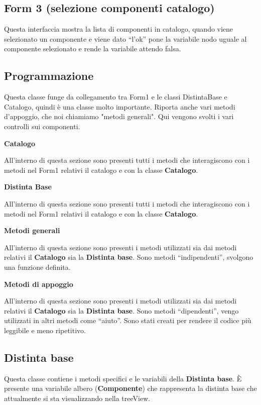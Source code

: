 \documentclass[12pt,twoside]{report}
\begin{document}
\subsection{Form 3 (selezione componenti catalogo)}

Questa interfaccia mostra la lista di componenti in catalogo, quando viene selezionato un componente e viene dato “l’ok” pone la variabile nodo uguale al componente selezionato e rende la variabile attendo falsa.

\subsection{Programmazione}

Questa classe funge da collegamento tra Form1 e le classi DistintaBase e Catalogo, quindi è una classe molto importante. Riporta anche vari metodi d'appoggio, che noi chiamiamo "metodi generali". Qui vengono svolti i vari controlli sui componenti.
 
\bigskip 
\textbf{Catalogo}

All’interno di questa sezione sono presenti tutti i metodi che interagiscono con i metodi nel Form1 relativi il catalogo e con la classe \textbf{Catalogo}.

\bigskip 
\textbf{Distinta Base}

All’interno di questa sezione sono presenti tutti i metodi che interagiscono con i metodi nel Form1 relativi il catalogo e con la classe \textbf{Catalogo}.

\bigskip 
\textbf{Metodi generali}

All’interno di questa sezione sono presenti i metodi utilizzati sia dai metodi relativi il \textbf{Catalogo} sia la \textbf{Distinta base}. Sono metodi “indipendenti”, svolgono una funzione definita.

\bigskip 
\textbf{Metodi di appoggio}

All’interno di questa sezione sono presenti i metodi utilizzati sia dai metodi relativi il \textbf{Catalogo} sia la \textbf{Distinta base}. Sono metodi “dipendenti”, vengo utilizzati in altri metodi come “aiuto”. Sono stati creati per rendere il codice più leggibile e meno ripetitivo.

\subsection{Distinta base}

Questa classe contiene i metodi specifici e le variabili della \textbf{Distinta base}. È presente una variabile albero (\textbf{Componente}) che rappresenta la distinta base che attualmente si sta visualizzando nella treeView. 
\end{document}
